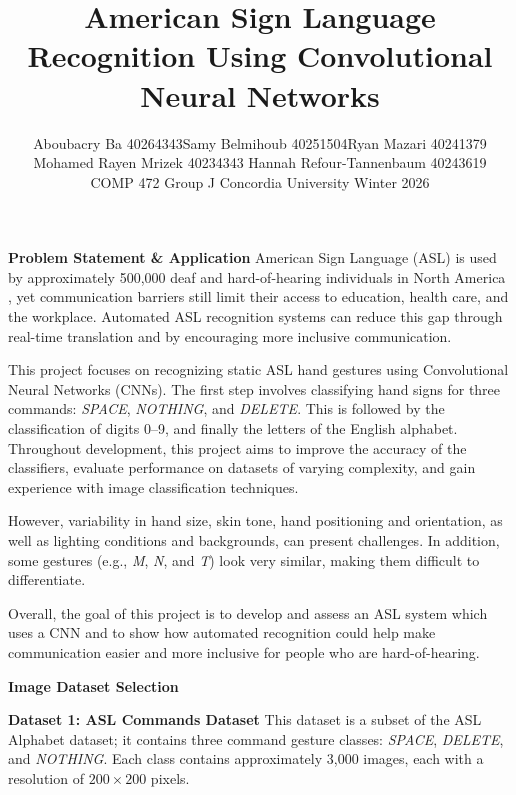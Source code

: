 \documentclass[10pt,twocolumn,letterpaper]{article}
\begin{document}
\title{American Sign Language Recognition Using Convolutional Neural Networks}

\author{
{\small Aboubacry Ba 40264343\quad Samy Belmihoub 40251504\quad Ryan Mazari 40241379\\ \small Mohamed Rayen Mrizek 40234343 \quad Hannah Refour-Tannenbaum 40243619}\\[0.3em]
COMP 472 \quad
Group J \quad Concordia University \quad Winter 2026
}


\maketitle
\noindent\textbf{Problem Statement \& Application \textbullet}
American Sign Language (ASL) is used by approximately 500,000 deaf and hard-of-hearing individuals in North America \cite{mitchell2022asl}, yet communication barriers still limit their access to education, health care, and the workplace. Automated ASL recognition systems can reduce this gap through real-time translation and by encouraging more inclusive communication.

This project focuses on recognizing static ASL hand gestures using Convolutional Neural Networks (CNNs). The first step involves classifying hand signs for three commands: \textit{SPACE}, \textit{NOTHING}, and \textit{DELETE}. This is followed by the classification of digits 0--9, and finally the letters of the English alphabet. Throughout development, this project aims to improve the accuracy of the classifiers, evaluate performance on datasets of varying complexity, and gain experience with image classification techniques.

However, variability in hand size, skin tone, hand positioning and orientation, as well as lighting conditions and backgrounds, can present challenges. In addition, some gestures (e.g., \textit{M}, \textit{N}, and \textit{T}) look very similar, making them difficult to differentiate.

Overall, the goal of this project is to develop and assess an ASL system which uses a CNN and to show how automated recognition could help make communication easier and more inclusive for people who are hard-of-hearing.

\vspace{0.5em}
\noindent\textbf{Image Dataset Selection }

\noindent\textbf{Dataset 1: ASL Commands Dataset \textbullet}
This dataset is a subset of the ASL Alphabet dataset; it contains three command gesture classes: \textit{SPACE}, \textit{DELETE}, and \textit{NOTHING}. Each class contains approximately 3,000 images, each with a resolution of $200 \times 200$ pixels\cite{asl_alphabet_kaggle}.
\end{document}
